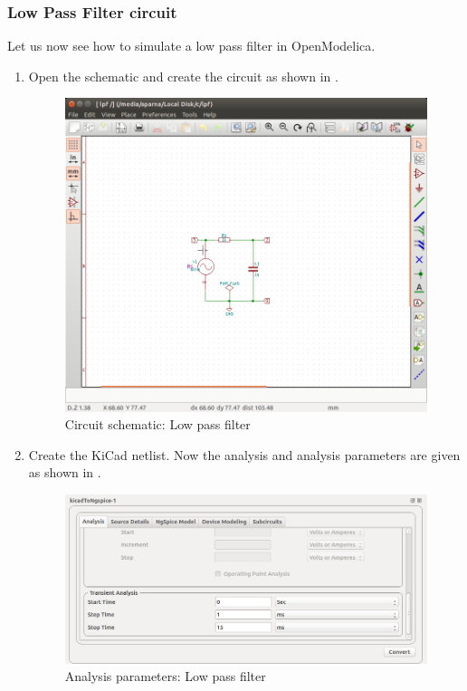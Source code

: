 \subsubsection {Low Pass Filter circuit} 
Let us now see how to simulate a low pass filter in OpenModelica.
\begin{enumerate}
\item Open the schematic and create the circuit as shown in . 

\begin{figure}[h]
\centering
\includegraphics[width=\lgfig]{list_of_figures/1.png}
\caption{Circuit schematic: Low pass filter}
\label{lowpass}
\end{figure}

\item Create the KiCad netlist. Now the analysis and analysis parameters are given as shown in . 

\begin{figure}[h]
\centering
\includegraphics[width=\lgfig]{list_of_figures/2.png}
\caption{Analysis parameters: Low pass filter}
\label{lowpass-analysis}
\end{figure}


\end{enumerate}
